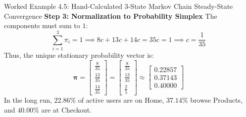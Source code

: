 \begin{examplebox}{Worked Example 4.5: Hand-Calculated 3-State Markov Chain Steady-State Convergence}
\textbf{Step 3: Normalization to Probability Simplex}
The components must sum to $1$:
\begin{equation*}
\sum_{i=1}^3 \pi_i = 1 \implies 8c + 13c + 14c = 35c = 1 \implies c = \frac{1}{35}
\end{equation*}
Thus, the unique stationary probability vector is:
\begin{equation*}
\boldsymbol{\pi} = \begin{bmatrix} \frac{8}{35} \\ \frac{13}{35} \\ \frac{14}{35} \end{bmatrix} = \begin{bmatrix} \frac{8}{35} \\ \frac{13}{35} \\ \frac{2}{5} \end{bmatrix} \approx \begin{bmatrix} \mathbf{0.22857} \\ \mathbf{0.37143} \\ \mathbf{0.40000} \end{bmatrix}
\end{equation*}
In the long run, $22.86\%$ of active users are on Home, $37.14\%$ browse Products, and $40.00\%$ are at Checkout.


\end{examplebox}
